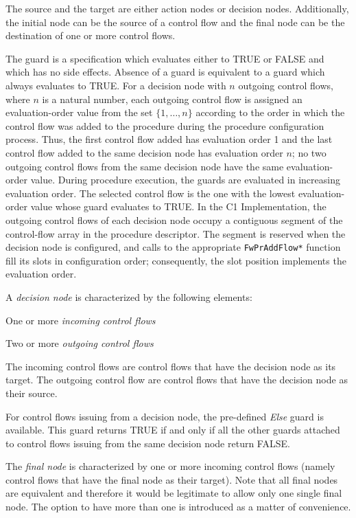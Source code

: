The source and the target are either action nodes or decision nodes. Additionally, the initial
node can be the source of a control flow and the final node can be the destination of one or
more control flows.

The guard is a specification which evaluates either to TRUE or FALSE and which
has no side effects. Absence of a guard is equivalent to a guard which always evaluates to TRUE.
For a decision node with $n$ outgoing control flows, where $n$ is a natural number, each outgoing
control flow is assigned an evaluation-order value from the set $\{1,\ldots,n\}$
according to the order in which the control flow was added to the procedure during the procedure
configuration process. Thus, the first control flow added has evaluation order 1 and the last
control flow added to the same decision node has evaluation order $n$; no two outgoing control flows
from the same decision node have the same evaluation-order value. During procedure execution,
the guards are evaluated in increasing evaluation order. The selected control flow is the one
with the lowest evaluation-order value whose guard evaluates to TRUE. In the C1 Implementation,
the outgoing control flows of each decision node occupy a contiguous segment of the control-flow
array in the procedure descriptor. The segment is reserved when the decision node is configured,
and calls to the appropriate \texttt{FwPrAddFlow*} function fill its slots in configuration order;
consequently, the slot position implements the evaluation order.

A \emph{decision node} is characterized by the following elements:
\begin{fw_itemize}
\item One or more \emph{incoming control flows}
\item Two or more \emph{outgoing control flows}
\end{fw_itemize}

The incoming control flows are control flows that have the decision node as its target. The
outgoing control flow are control flows that have the decision node as their source.

For control flows issuing from a decision node, the pre-defined \textit{Else} guard is available. This
guard returns TRUE if and only if all the other guards attached to control flows issuing from
the same decision node return FALSE.

The \emph{final node} is characterized by one or more incoming control flows (namely control flows
that have the final node as their target). Note that all final nodes are equivalent and therefore it
would be legitimate to allow only one single final node. The option to have more than one is
introduced as a matter of convenience.


